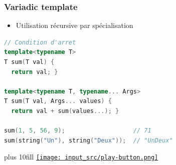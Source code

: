 \documentclass[C++.tex]{subfiles}
\begin{document}
\begin{frame}[fragile]
	\frametitle{Variadic template}
	\begin{itemize}
		\item Utilisation récursive par spécialisation
	\end{itemize}

	\begin{lstlisting}[language=C++]
// Condition d'arret
template<typename T>
T sum(T val) {
  return val; }

template<typename T, typename... Args>
T sum(T val, Args... values) {
  return val + sum(values...); }

sum(1, 5, 56, 9);                   // 71
sum(string("Un"), string("Deux"));  // "UnDeux"\end{lstlisting}


	\vskip 10mm plus 10fill
	\hfill
	\href{https://godbolt.org/#g:!((g:!((g:!((h:codeEditor,i:(filename:'1',fontScale:14,fontUsePx:'0',j:1,lang:c%2B%2B,selection:(endColumn:1,endLineNumber:22,positionColumn:1,positionLineNumber:22,selectionStartColumn:1,selectionStartLineNumber:22,startColumn:1,startLineNumber:22),source:'%23include+%3Ciostream%3E%0A%23include+%3Cstring%3E%0A%0A//+Condition+d!'arret%0Atemplate%3Ctypename+T%3E%0AT+sum(T+val)%0A%7B%0A++return+val%3B%0A%7D%0A%0Atemplate%3Ctypename+T,+typename...+Args%3E%0AT+sum(T+val,+Args...+values)%0A%7B%0A++return+val+%2B+sum(values...)%3B%0A%7D%0A%0Aint+main()%0A%7B%0A++std::cout+%3C%3C+sum(1,+5,+56,+9)+%3C%3C+!'%5Cn!'%3B%0A++std::cout+%3C%3C+sum(std::string(%22Un%22),+std::string(%22Deux%22))+%3C%3C+!'%5Cn!'%3B%0A%7D%0A'),l:'5',n:'0',o:'C%2B%2B+source+%231',t:'0')),k:50,l:'4',n:'0',o:'',s:0,t:'0'),(g:!((h:executor,i:(argsPanelShown:'1',compilationPanelShown:'0',compiler:g112,compilerOutShown:'0',execArgs:'',execStdin:'',fontScale:14,fontUsePx:'0',j:1,lang:c%2B%2B,libs:!((name:boost,ver:'175')),options:'-std%3Dc%2B%2B11',source:1,stdinPanelShown:'1',tree:'1',wrap:'0'),l:'5',n:'0',o:'Executor+x86-64+gcc+11.2+(C%2B%2B,+Editor+%231)',t:'0')),header:(),k:50,l:'4',n:'0',o:'',s:0,t:'0')),l:'2',n:'0',o:'',t:'0')),version:4}{\texttt{[image: input\_src/play-button.png]}}
\end{frame}
\end{document}
